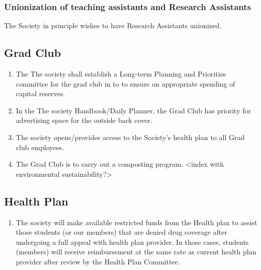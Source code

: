 \subsubsection{Unionization of teaching assistants and Research Assistants}
\begin{longenum}[ label*=\thesubsubsection.\arabic*., align=left]
\item 	The Society in principle wishes to have Research Assistants unionized.
\end{longenum}


\subsection{Grad Club}
\begin{enumerate}
\item The The society shall establish a Long-term Planning and Priorities committee for the grad club in to to ensure on appropriate spending of capital reserves.   
\item In the The society Handbook/Daily Planner, the Grad Club has priority for advertising space for the outside back cover.  
\item The society opens/provides access to the Society's health plan to all Grad club employees.  
\item The Grad Club is to carry out a composting program. <index with environmental sustainability?>   
\end{enumerate}

\subsection{Health Plan}
\begin{enumerate}
\item  The society will make available restricted funds from the Health plan to assist those students (or our members) that are denied drug coverage after undergoing a full appeal with health plan provider.  In those cases, students (members) will receive reimbursement at the same rate as current health plan provider after review by the Health Plan Committee.  
\end{enumerate}


